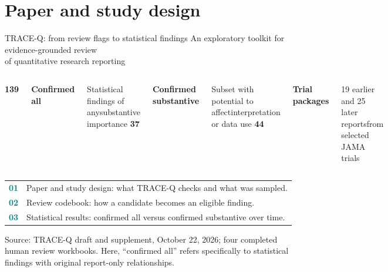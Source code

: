 \documentclass[10pt,aspectratio=169]{beamer}
\newcommand{\src}[1]{\par\vfill{\color{Slate}\fontsize{6.5}{8}\selectfont #1\par}}
\begin{document}
\section{Paper and study design}
\begin{frame}[t]{TRACE-Q: from review flags to statistical findings}
\vspace{1mm}
{\large An exploratory toolkit for evidence-grounded review\\of quantitative research reporting}\par
\vspace{4mm}
\begin{columns}[T,onlytextwidth]
{\color{Blue}\fontsize{30}{32}\selectfont\bfseries 139}\par
\textbf{Confirmed all}\par
\small Statistical findings of any\newline substantive importance
{\color{Teal}\fontsize{30}{32}\selectfont\bfseries 37}\par
\textbf{Confirmed substantive}\par
\small Subset with potential to affect\newline interpretation or data use
{\color{Navy}\fontsize{30}{32}\selectfont\bfseries 44}\par
\textbf{Trial packages}\par
\small 19 earlier and 25 later reports\newline from selected JAMA trials
\end{columns}
\vspace{5mm}
\begin{tabularx}{\linewidth}{@{}rY@{}}
\textcolor{Teal}{\textbf{01}} & Paper and study design: what TRACE-Q checks and what was sampled.\\
\textcolor{Teal}{\textbf{02}} & Review codebook: how a candidate becomes an eligible finding.\\
\textcolor{Teal}{\textbf{03}} & Statistical results: confirmed all versus confirmed substantive over time.
\end{tabularx}
\src{Source: TRACE-Q draft and supplement, October 22, 2026; four completed human review workbooks. Here, ``confirmed all'' refers specifically to statistical findings with original report-only relationships.}
\end{frame}
\end{document}
